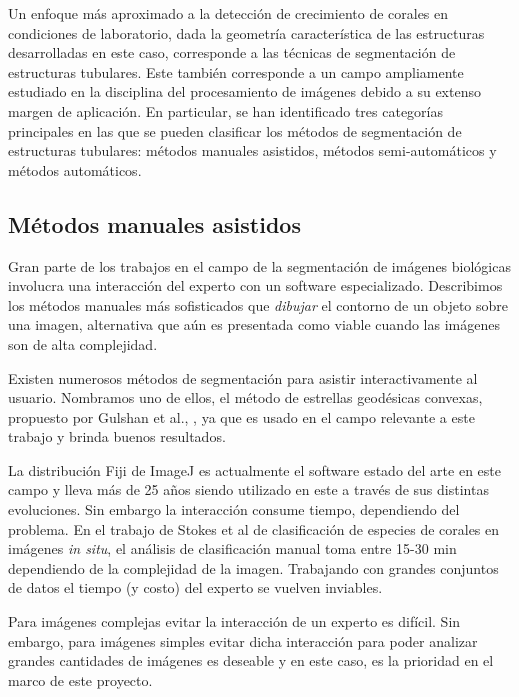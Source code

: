 \documentclass[journal]{IEEEtran}
\begin{document}
Un enfoque más aproximado a la detección de crecimiento de corales en condiciones de
laboratorio, dada la geometría característica de las estructuras desarrolladas en este
caso, corresponde a las técnicas de segmentación de estructuras tubulares. Este también
corresponde a un campo ampliamente estudiado en la disciplina del procesamiento de
imágenes debido a su extenso margen de aplicación. En particular, se han identificado
tres categorías principales en las que se pueden clasificar los métodos de segmentación
de estructuras tubulares: métodos manuales asistidos, métodos semi-automáticos y
métodos automáticos.


\subsection{Métodos manuales asistidos}

Gran parte de los trabajos en el campo de la segmentación de imágenes biológicas
involucra una interacción del experto con un software especializado. Describimos los
métodos manuales más sofisticados que \textit{dibujar} el contorno de un objeto sobre una
imagen, alternativa que aún es presentada como viable \cite{neal_methods_2015} cuando las imágenes son de alta complejidad.

Existen numerosos métodos de segmentación para asistir interactivamente al usuario.
Nombramos uno de ellos, el método de estrellas geodésicas convexas, propuesto por Gulshan
et al., \cite{gulshan_geodesic_2010}, ya que es usado en el campo relevante a este
trabajo \cite{treibitz_wide_2015} y brinda buenos resultados.

La distribución Fiji
de ImageJ \cite{schindelin_fiji:_2012} es actualmente el software estado del arte en este
campo y lleva más de 25 años \cite{schneider_nih_2012} siendo utilizado en este a través
de sus distintas evoluciones. Sin embargo la interacción consume tiempo, dependiendo del
problema. En el trabajo
de Stokes et al \cite{stokes_automated_2009} de clasificación de especies de corales en
imágenes \textit{in situ}, el análisis de clasificación manual toma entre 15-30 min dependiendo de la
complejidad de la imagen. Trabajando con grandes conjuntos de datos el tiempo (y costo)
del experto se vuelven inviables.

Para imágenes complejas evitar la interacción de un experto es difícil. Sin embargo, para
imágenes simples evitar dicha interacción para poder analizar grandes cantidades de
imágenes es deseable y en este caso, es la prioridad en el marco de este proyecto.
\end{document}
